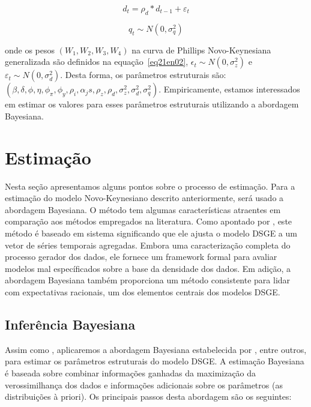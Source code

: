 \documentclass[twoside,a4paper,11pt]{report}
\begin{document}
{{\begin{equation}\label{eq28en02}
{d}_{t}={\rho}_{d}\ast {d}_{t-1}+{\varepsilon}_{t}
\end{equation}

\begin{equation}\label{eq29en02}
{q}_{t}\sim N\left(0,{\sigma}_{q}^{2}\right) 
\end{equation}

\noindent onde os pesos $(W_{1},W_{2},W_{3},W_{4})$ na curva de Phillips Novo-Keynesiana generalizada são definidos na equação~\ref{eq21en02}, ${\epsilon}_{t}\sim N\left( 0,{\sigma}_{z}^{2}\right)$ e ${\varepsilon}_{t}\sim N\left( 0,{\sigma}_{d}^{2}\right)$. Desta forma, os parâmetros estruturais são: $(\beta,\delta,\phi,\eta,\phi_{\pi},\phi_{y},\rho_{i},\alpha_{j}s,\rho_{z},\rho_{d},{\sigma}_{z}^{2},{\sigma}_{d}^{2},{\sigma}_{q}^{2})$. Empiricamente, estamos interessados em estimar os valores para esses parâmetros estruturais utilizando a abordagem Bayesiana.

\section*{Estimação}

Nesta seção apresentamos alguns pontos sobre o processo de estimação. Para a estimação do modelo Novo-Keynesiano descrito anteriormente, será usado a abordagem Bayesiana. O método tem algumas características atraentes em comparação aos métodos empregados na literatura. Como apontado por \citet{an2007bayesian}, este método é baseado em sistema significando que ele ajusta o modelo DSGE a um vetor de séries temporais agregadas. Embora uma caracterização completa do processo gerador dos dados, ele fornece um framework formal para avaliar modelos mal específicados sobre a base da densidade dos dados. Em adição, a abordagem Bayesiana também proporciona um método consistente para lidar com expectativas racionais, um dos elementos centrais dos modelos DSGE.

\subsection*{Inferência Bayesiana}

Assim como \citet{yao2010aggregate}, aplicaremos a abordagem Bayesiana estabelecida por \citet{dejong2000bayesian}, \citet{schorfheide2000loss} entre outros, para estimar os parâmetros estruturais do modelo DSGE. A estimação Bayesiana é baseada sobre combinar informações ganhadas da maximização da verossimilhança dos dados e informações adicionais sobre os parâmetros (as distribuições à priori). Os principais passos desta abordagem são os seguintes:

}}
\end{document}

